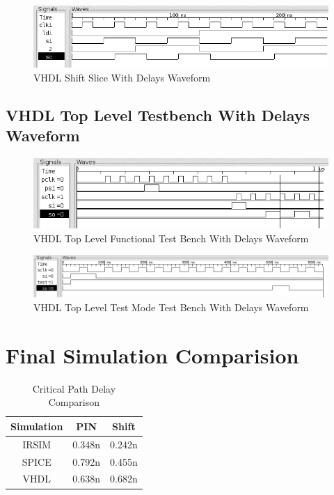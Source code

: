        \begin{figure}[H]
            \centering
            \includegraphics[width=\linewidth]{../../doc/vhdl_sim_pics/shift_slice_with_delays.png}
            \caption{VHDL Shift Slice With Delays Waveform}
        \end{figure}

    \subsection{VHDL Top Level Testbench With Delays Waveform}
        \begin{figure}[H]
            \centering
            \includegraphics[width=\linewidth]{../../doc/vhdl_sim_pics/top.png}
            \caption{VHDL Top Level Functional Test Bench With Delays Waveform}
        \end{figure}

        \begin{figure}[H]
            \centering
            \includegraphics[width=\linewidth]{../../doc/vhdl_sim_pics/top_test.png}
            \caption{VHDL Top Level Test Mode Test Bench With Delays Waveform}
        \end{figure}

\section{Final Simulation Comparision}

        \begin{table}[H]
            \centering
            \begin{tabular}{ccc}
                \toprule
                \textbf{Simulation} & \textbf{PIN} & \textbf{Shift} \\
                \midrule
                IRSIM & 0.348n & 0.242n \\
                SPICE & 0.792n & 0.455n \\
                VHDL  & 0.638n & 0.682n \\
                \bottomrule
            \end{tabular}
            \caption{Critical Path Delay Comparison}
        \end{table}

